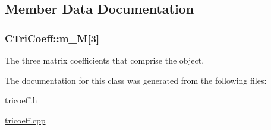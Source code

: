 \subsection{Member Data Documentation}
\hypertarget{classCTriCoeff_afac3ecb3b5c965a7ba4cc0409c2100e8}{
\subsubsection[{m\-\_\-\-M}]{ C\-Tri\-Coeff\-::m\-\_\-\-M\mbox{[}3\mbox{]}\hspace{0.3cm}{\ttfamily [protected]}}}\label{classCTriCoeff_afac3ecb3b5c965a7ba4cc0409c2100e8}


The three matrix coefficients that comprise the object. 



The documentation for this class was generated from the following files\-:\begin{DoxyCompactItemize}
\item 
\hyperlink{tricoeff_8h}{tricoeff.\-h}\item 
\hyperlink{tricoeff_8cpp}{tricoeff.\-cpp}\end{DoxyCompactItemize}
